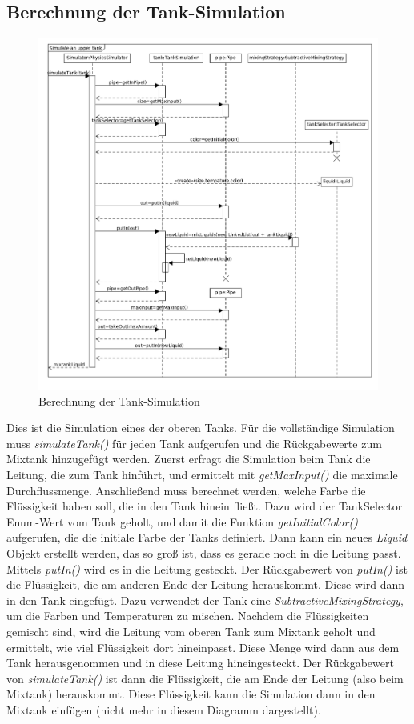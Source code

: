 \documentclass[parskip=full]{scrartcl}
\begin{document}
\subsection{Berechnung der Tank-Simulation}
\begin{figure}[H]
  \centering
  \includegraphics[scale=0.45]{design/sequence-diagrams/tank-simulation.png}
  \caption{Berechnung der Tank-Simulation}
\end{figure}
Dies ist die Simulation eines der oberen Tanks. Für die vollständige Simulation muss \emph{simulateTank()} für jeden Tank aufgerufen
und die Rückgabewerte zum Mixtank hinzugefügt werden. Zuerst erfragt die Simulation beim Tank die Leitung, die zum Tank hinführt, und ermittelt
mit \emph{getMaxInput()} die maximale Durchflussmenge. Anschließend muss berechnet werden, welche Farbe die Flüssigkeit haben soll, die in den Tank
hinein fließt. Dazu wird der TankSelector Enum-Wert vom Tank geholt, und damit die Funktion \emph{getInitialColor()} aufgerufen, die die initiale Farbe der Tanks definiert.
Dann kann ein neues \emph{Liquid} Objekt erstellt werden, das so groß ist, dass es gerade noch in die Leitung passt. Mittels \emph{putIn()} wird es
in die Leitung gesteckt. Der Rückgabewert von \emph{putIn()} ist die Flüssigkeit, die am anderen Ende der Leitung herauskommt. Diese wird dann in den
Tank eingefügt. Dazu verwendet der Tank eine \emph{SubtractiveMixingStrategy}, um die Farben und Temperaturen zu mischen. Nachdem die Flüssigkeiten
gemischt sind, wird die Leitung vom oberen Tank zum Mixtank geholt und ermittelt, wie viel Flüssigkeit dort hineinpasst. Diese Menge wird dann aus dem
Tank herausgenommen und in diese Leitung hineingesteckt. Der Rückgabewert von \emph{simulateTank()} ist dann die Flüssigkeit, die am Ende der Leitung
(also beim Mixtank) herauskommt. Diese Flüssigkeit kann die Simulation dann in den Mixtank einfügen (nicht mehr in diesem Diagramm dargestellt).
\end{document}
